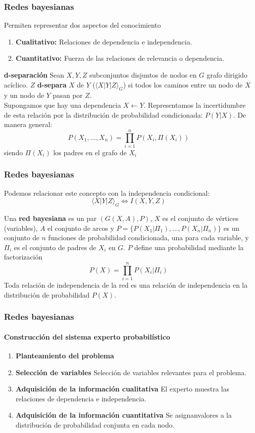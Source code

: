 \documentclass[leqno]{beamer}
\begin{document}
\begin{frame}
\frametitle{Redes bayesianas}
Permiten representar dos aspectos del conocimiento
\begin{enumerate}
\item \textbf{Cualitativo:} Relaciones de dependencia e independencia.
\item \textbf{Cuantitativo:} Fuerza de las relaciones de relevancia o dependencia.
\end{enumerate}

\textbf{d-separación} Sean $X,Y,Z$ subconjuntos disjuntos de nodos en $G$ grafo dirigido acíclico. $Z$ \textbf{d-separa} $X$ de $Y$ ($\langle X|Y|Z \rangle_G$) si todos los caminos entre un nodo de $X$ y un nodo de $Y$ pasan por $Z$.\\

Supongamos que hay una dependencia $X \leftarrow Y$. Representamos la incertidumbre de esta relación por la distribución de probabilidad condicionada: $P(Y|X)$. De manera general:
	\[ P(X_1, \dots,X_n) = \prod\limits_{i=1}^n P(X_i,\Pi(X_i))\]
	siendo $\Pi(X_i)$ los padres en el grafo de $X_i$
\end{frame}


\begin{frame}
\frametitle{Redes bayesianas}
Podemos relacionar este concepto con la independencia condicional:
\[ \langle X|Y|Z \rangle_G \Leftrightarrow I(X,Y,Z) \]

Una \textbf{red bayesiana} es un par $(G(X,A),P)$, $X$ es el conjunto de vértices (variables), $A$ el conjunto de arcos y $P=\{P(X_1|\Pi_1),\dots,P(X_n|\Pi_n)\}$ es un conjunto de $n$ funciones de probabilidad condicionada, una para cada variable, y $\Pi_i$ es el conjunto de padres de $X_i$ en $G$. $P$ define una probabilidad mediante la factorización
\[ P(X) = \prod\limits_{i=1}^n P(X_i|\Pi_i)	\]
Toda relación de independencia de la red es una relación de independencia en la distribución de probabilidad $P(X)$.
\end{frame}

\begin{frame}
\frametitle{Redes bayesianas}
\framesubtitle{Construcción del sistema experto probabilístico}

\begin{enumerate}
\item \textbf{Planteamiento del problema}
\item \textbf{Selección de variables} Selección de variables relevantes para el problema.
\item \textbf{Adquisición de la información cualitativa} El experto muestra las relaciones de dependencia e independencia.
\item \textbf{Adquisición de la información cuantitativa} Se asignanvalores a la distribución de probabilidad conjunta en cada nodo. 
\end{enumerate}
\end{frame}
\end{document}
